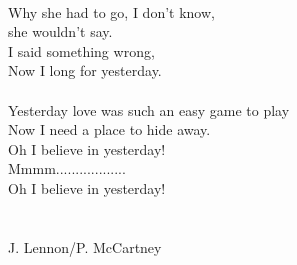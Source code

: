  \\
Why she had to go, I don't know, \\
she wouldn't say. \\
I said something wrong, \\
Now I long for yesterday. \\
 \\
Yesterday love was such an easy game to play \\
Now I need a place to hide away. \\
Oh I believe in yesterday! \\
Mmmm.................. \\
Oh I believe in yesterday! \\
 \\
 \\
J. Lennon/P. McCartney \\
